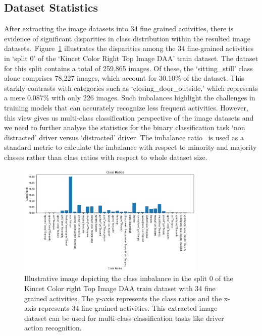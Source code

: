 \subsection{Dataset Statistics}
\label{section:Imbalance and Dataset Statistics}
After extracting the image datasets into 34 fine grained activities, there is evidence of significant disparities in class distribution within the resulted image datasets.~Figure~\ref{fig:driveandact_multi_class_imbalance_split_0} illustrates the disparities among the 34 fine-grained activities in `split 0' of the `Kincet Color Right Top Image DAA' train dataset. The dataset for this split contains a total of 259,865 images. Of these, the `sitting\_still' class alone comprises 78,227 images, which account for 30.10\% of the dataset. This starkly contrasts with categories such as `closing\_door\_outside,' which represents a mere 0.087\% with only 226 images. Such imbalances highlight the challenges in training models that can accurately recognize less frequent activities. However, this view gives us multi-class classification perspective of the image datasets and we need to further analyse the statistics for the binary classification task `non distracted' driver versus `distracted' driver. The imbalance ratio~\citep{23_ImR_buda2018systematic} is used as a standard metric to calculate the imbalance with respect to minority and majority classes rather than class ratios with respect to whole dataset size.
\begin{figure}[h]
\begin{center}
\includegraphics[width=0.8\textwidth]{Images_Thesis/daa_images/class_ratios_spli_0_train_output.png}
\end{center}
\caption[Illustrative image depicting the class imbalance in the split 0 of the Kincet Color Right Top Image DAA train dataset with 34 fine grained activities.]{Illustrative image depicting the class imbalance in the split 0 of the Kincet Color right Top Image DAA train dataset with 34 fine grained activities. The y-axis represents the class ratios and the x-axis represents 34 fine-grained activities. This extracted image dataset can be used for multi-class classification tasks like driver action recognition.}
\label{fig:driveandact_multi_class_imbalance_split_0}
\end{figure}

